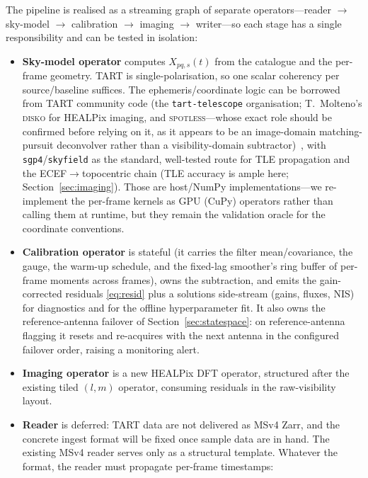 \documentclass[11pt]{article}
\begin{document}
The pipeline is realised as a streaming graph of separate operators---reader $\to$ sky-model $\to$
calibration $\to$ imaging $\to$ writer---so each stage has a single responsibility and can be tested
in isolation:
\begin{itemize}[leftmargin=*]
  \item \textbf{Sky-model operator} computes $X_{pq,s}(t)$ from the catalogue and the per-frame
        geometry. TART is single-polarisation, so one scalar coherency per source/baseline suffices.
        The ephemeris/coordinate logic can be borrowed from TART community code (the
        \texttt{tart-telescope} organisation; T.~Molteno's \textsc{disko} for HEALPix imaging, and
        \textsc{spotless}---whose exact role should be confirmed before relying on it, as it appears
        to be an image-domain matching-pursuit deconvolver rather than a visibility-domain
        subtractor)~\cite{disko}, with \texttt{sgp4}/\texttt{skyfield} as the standard,
        well-tested route for TLE propagation and the ECEF$\to$topocentric chain (TLE accuracy is
        ample here; Section~\ref{sec:imaging}). Those are host/NumPy implementations---we
        re-implement the per-frame kernels as GPU (CuPy) operators rather than calling them at
        runtime, but they remain the validation oracle for the coordinate conventions.
  \item \textbf{Calibration operator} is stateful (it carries the filter mean/covariance, the gauge,
        the warm-up schedule, and the fixed-lag smoother's ring buffer of per-frame moments across
        frames), owns the subtraction, and emits the gain-corrected
        residuals \eqref{eq:resid} plus a solutions side-stream (gains, fluxes, NIS) for diagnostics
        and for the offline hyperparameter fit. It also owns the reference-antenna failover of
        Section~\ref{sec:statespace}: on reference-antenna flagging it resets and re-acquires with
        the next antenna in the configured failover order, raising a monitoring alert.
  \item \textbf{Imaging operator} is a new HEALPix DFT operator, structured after the existing tiled
        $(l,m)$ operator, consuming residuals in the raw-visibility layout.
  \item \textbf{Reader} is deferred: TART data are not delivered as MSv4 Zarr, and the concrete ingest
        format will be fixed once sample data are in hand. The existing MSv4 reader serves only as a
        structural template. Whatever the format, the reader must propagate per-frame timestamps:

\end{itemize}
\end{document}
